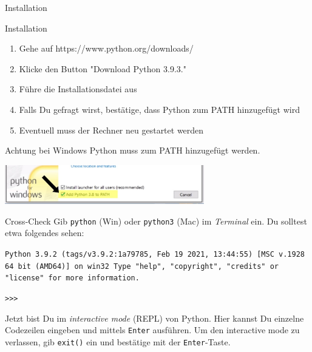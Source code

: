 \documentclass[algorithm,pgfplots,colortheme=dark]{cuzbeamer}
\newcommand{\py}[1]{\texttt{#1}}
\newcommand{\bash}[1]{\texttt{#1}}
\begin{document}
\begin{frame}{Installation}
\begin{block}{Installation}
\begin{enumerate}
	\item Gehe auf https://www.python.org/downloads/
	\item Klicke den Button "Download Python 3.9.3."
	\item Führe die Installationsdatei aus
	\item Falls Du gefragt wirst, bestätige, dass Python zum PATH hinzugefügt wird
	\item Eventuell muss der Rechner neu gestartet werden
\end{enumerate}	
\end{block}

\begin{alertblock}{Achtung bei Windows}
\vspace{2pt}
Python muss zum PATH hinzugefügt werden. 

\includegraphics[width=0.65\textwidth]{python_path.jpg}
\end{alertblock}

\end{frame}

\begin{frame}
\begin{block}{Cross-Check}
\vspace{2pt}
Gib \bash{python} (Win) oder \bash{python3} (Mac) im \textit{Terminal} ein.
Du solltest etwa folgendes sehen:  
\vspace{12pt}

\texttt{Python 3.9.2 (tags/v3.9.2:1a79785, Feb 19 2021, 13:44:55) [MSC v.1928 64 bit (AMD64)] on win32
	Type "help", "copyright", "credits"{} or "license"{} for more information.}

\texttt{>{}>{}>}
\end{block}
\begin{block}{}
Jetzt bist Du im \textit{interactive mode} (REPL) von Python. Hier kannst Du einzelne Codezeilen eingeben und mittels \bash{Enter} ausführen. 
Um den interactive mode zu verlassen, gib \py{exit()} ein und bestätige mit der \bash{Enter}-Taste. 	
\end{block}
\end{frame}
\end{document}

